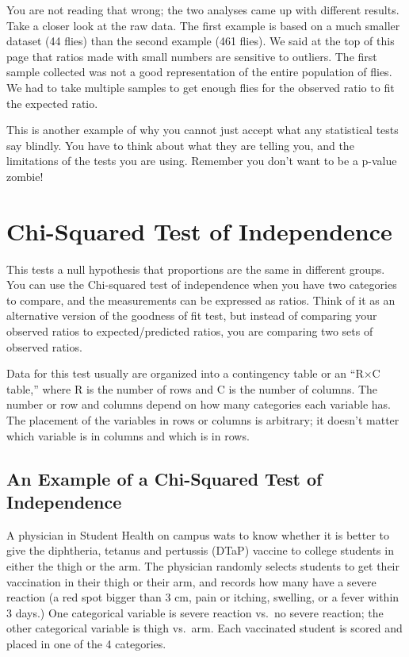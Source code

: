 \documentclass[
]{book}
\begin{document}
You are not reading that wrong; the two analyses came up with different results. Take a closer look at the raw data. The first example is based on a much smaller dataset (44 flies) than the second example (461 flies). We said at the top of this page that ratios made with small numbers are sensitive to outliers. The first sample collected was not a good representation of the entire population of flies. We had to take multiple samples to get enough flies for the observed ratio to fit the expected ratio.

This is another example of why you cannot just accept what any statistical tests say blindly. You have to think about what they are telling you, and the limitations of the tests you are using. Remember you don't want to be a p-value zombie!

\hypertarget{chi-squared-test-of-independence}{%
\section{Chi-Squared Test of Independence}\label{chi-squared-test-of-independence}}

This tests a null hypothesis that proportions are the same in different groups. You can use the Chi-squared test of independence when you have two categories to compare, and the measurements can be expressed as ratios. Think of it as an alternative version of the goodness of fit test, but instead of comparing your observed ratios to expected/predicted ratios, you are comparing two sets of observed ratios.

Data for this test usually are organized into a contingency table or an ``R×C table,'' where R is the number of rows and C is the number of columns. The number or row and columns depend on how many categories each variable has. The placement of the variables in rows or columns is arbitrary; it doesn't matter which variable is in columns and which is in rows.

\hypertarget{an-example-of-a-chi-squared-test-of-independence}{%
\subsection{An Example of a Chi-Squared Test of Independence}\label{an-example-of-a-chi-squared-test-of-independence}}

A physician in Student Health on campus wats to know whether it is better to give the diphtheria, tetanus and pertussis (DTaP) vaccine to college students in either the thigh or the arm. The physician randomly selects students to get their vaccination in their thigh or their arm, and records how many have a severe reaction (a red spot bigger than 3 cm, pain or itching, swelling, or a fever within 3 days.) One categorical variable is severe reaction vs.~no severe reaction; the other categorical variable is thigh vs.~arm. Each vaccinated student is scored and placed in one of the 4 categories.
\end{document}
